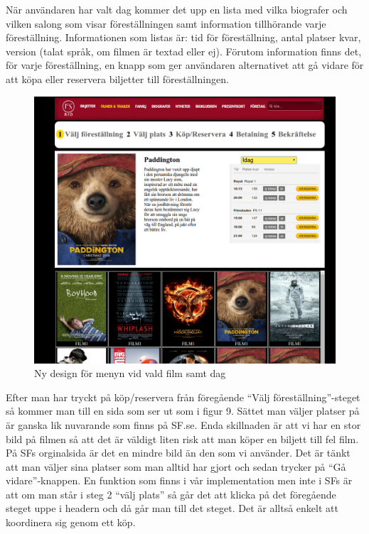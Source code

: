 \documentclass[swedish,a4paper,11pt]{article}
\begin{document}
\newpage
När användaren har valt dag kommer det upp en lista med vilka biografer och vilken salong som visar föreställningen samt information tillhörande varje föreställning. Informationen som listas är: tid för föreställning, antal platser kvar, version (talat språk, om filmen är textad eller ej). Förutom information finns det, för varje föreställning, en knapp som ger användaren alternativet att gå vidare för att köpa eller reservera biljetter till föreställningen.  

\begin{figure}[H]
\centering
\includegraphics[scale=0.27]{valddag.png} 
\caption{Ny design för menyn vid vald film samt dag}
\end{figure}



\newpage

Efter man har tryckt på köp/reservera från föregående “Välj föreställning”-steget så kommer man till en sida som ser ut som i figur 9. Sättet man väljer platser på är ganska lik nuvarande som finns på SF.se. Enda skillnaden är att vi har en stor bild på filmen så att det är väldigt liten risk att man köper en biljett till fel film. På SFs orginalsida är det en mindre bild än den som vi använder. Det är tänkt att man väljer sina platser som man alltid har gjort och sedan trycker på “Gå vidare”-knappen. En funktion som finns i vår implementation men inte i SFs är att om man står i steg 2 “välj plats” så går det att klicka på det föregående steget uppe i headern och då går man till det steget. Det är alltså enkelt att koordinera sig genom ett köp.
\end{document}
